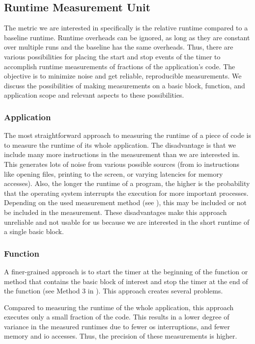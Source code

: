 \subsection{Runtime Measurement Unit}
\label{sec:approach:runtime-measurement-unit}
The metric we are interested in specifically is the relative runtime compared to a baseline runtime.
Runtime overheads can be ignored, as long as they are constant over multiple runs and the baseline has the same overheads.
Thus, there are various possibilities for placing the start and stop events of the timer to accomplish runtime measurements of fractions of the application's code.
The objective is to minimize noise and get reliable, reproducible measurements.
We discuss the possibilities of making measurements on a basic block, function, and application scope and relevant aspects to these possibilities.

\subsubsection{Application}
\label{sec:approach:datageneration:runtime:app}
The most straightforward approach to measuring the runtime of a piece of code is to measure the runtime of its whole application.
The disadvantage is that we include many more instructions in the measurement than we are interested in.
This generates lots of noise from various possible sources (\eg from \ac{io} instructions like opening files, printing to the screen, or varying latencies for memory accesses).
Also, the longer the runtime of a program, the higher is the probability that the operating system interrupts the execution for more important processes.
Depending on the used measurement method (see ), this may be included or not be included in the measurement.
These disadvantages make this approach unreliable and not usable for us because we are interested in the short runtime of a single basic block.

\subsubsection{Function}
\label{sec:approach:datageneration:runtime:function}
A finer-grained approach is to start the timer at the beginning of the function or method that contains the basic block of interest and stop the timer at the end of the function (see Method 3 in ).
This approach creates several problems.

Compared to measuring the runtime of the whole application, this approach executes only a small fraction of the code.
This results in a lower degree of variance in the measured runtimes due to fewer \ac{os} interruptions, and fewer memory and \ac{io} accesses.
Thus, the precision of these measurements is higher.

